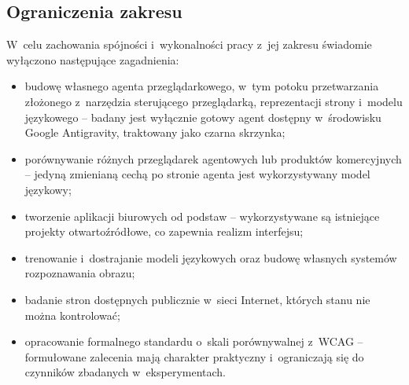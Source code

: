 \subsection*{Ograniczenia zakresu}
W~celu zachowania spójności i~wykonalności pracy z~jej zakresu świadomie wyłączono następujące zagadnienia:
\begin{itemize}
    \item budowę własnego agenta przeglądarkowego, w~tym potoku przetwarzania złożonego z~narzędzia sterującego przeglądarką, reprezentacji strony i~modelu językowego -- badany jest wyłącznie gotowy agent dostępny w~środowisku Google Antigravity, traktowany jako czarna skrzynka;
    \item porównywanie różnych przeglądarek agentowych lub produktów komercyjnych -- jedyną zmienianą cechą po stronie agenta jest wykorzystywany model językowy;
    \item tworzenie aplikacji biurowych od podstaw -- wykorzystywane są istniejące projekty otwartoźródłowe, co zapewnia realizm interfejsu;
    \item trenowanie i~dostrajanie modeli językowych oraz budowę własnych systemów rozpoznawania obrazu;
    \item badanie stron dostępnych publicznie w~sieci Internet, których stanu nie można kontrolować;
    \item opracowanie formalnego standardu o~skali porównywalnej z~WCAG -- formułowane zalecenia mają charakter praktyczny i~ograniczają się do czynników zbadanych w~eksperymentach.
\end{itemize}
